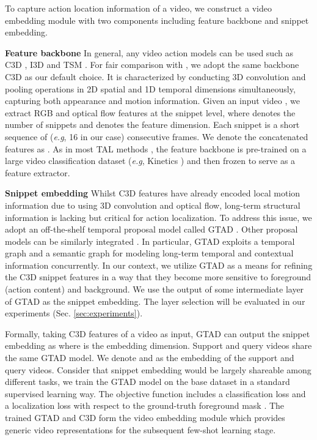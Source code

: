 \documentclass{bmvc2k}
\def\eg{\emph{e.g}\bmvaOneDot}
\begin{document}
To capture action location information of a video, we construct a video embedding module with two components including feature backbone and snippet embedding.

\noindent\textbf{Feature backbone } 
In general, any video action models can be used such as 
C3D \cite{tran2015learning}, I3D \cite{carreira2017quo} and TSM \cite{lin2019tsm}.
For fair comparison with \cite{yang2020localizing},
we adopt the same backbone C3D as our default choice.
It is characterized by conducting 3D convolution and pooling operations in 2D spatial and 1D temporal dimensions simultaneously, capturing both appearance and motion information.  
Given an input video , 
we extract RGB  
and 
optical flow 
features at the snippet level,
where  denotes the number of snippets and  denotes the feature dimension.
Each snippet is a short sequence of (\eg, 16 in our case) consecutive frames. 
We denote the concatenated features as .
As in most TAL methods \cite{xu2020gtad,xu2017r,lin2019bmn},
the feature backbone is pre-trained on a large video classification
dataset (\eg, Kinetics \cite{kay2017kinetics}) and 
then frozen to serve as a feature extractor.


\noindent\textbf{Snippet embedding }
Whilst C3D features have already encoded local motion information
due to using 3D convolution and optical flow,
long-term structural information is lacking but
critical for action localization.
To address this issue, we adopt an off-the-shelf temporal proposal model called GTAD \cite{xu2020gtad}. Other proposal models can be similarly integrated \cite{lin2018bsn,lin2019bmn,xu2020gtad}.
In particular, GTAD exploits a temporal graph and a semantic graph
for modeling long-term temporal and contextual information concurrently.
In our context, we utilize GTAD as a means for refining the C3D snippet features in a way that they become more sensitive to foreground (action content) and background.
We use the output of some intermediate layer of GTAD
as the snippet embedding.
The layer selection will be evaluated in our experiments (Sec. \ref{sec:experiments}).

Formally, taking C3D features  of a video as input, 
GTAD can output the snippet embedding as 
where  is the embedding dimension.
Support and query videos share the same GTAD model. {We denote  and  as the embedding of the support and query videos.}
Consider that snippet embedding would be largely shareable
among different tasks,
we train the GTAD model on the base dataset
in a standard supervised learning way.
The objective function includes a classification loss 
and a localization loss with respect to the ground-truth foreground mask  \cite{xu2020gtad}.
The trained GTAD and C3D form the video embedding module
which provides generic video representations for the
subsequent few-shot learning stage.
\end{document}
